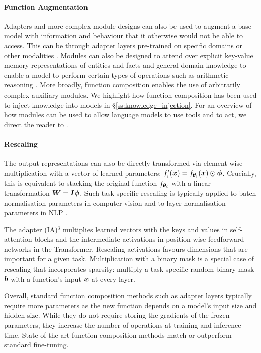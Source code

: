 \documentclass[10pt]{article} %
\begin{document}
\paragraph*{Function Augmentation} Adapters and more complex module designs can also be used to augment a base model with information and behaviour that it otherwise would not be able to access. This can be through adapter layers pre-trained on specific domains \citep{wang-etal-2021-k} or other modalities \citep{alayrac2022flamingo}. Modules can also be designed to attend over explicit key-value memory representations of entities and facts \citep{verga-etal-2021-adaptable} and general domain knowledge \citep{cheng-etal-2023-decouple} to enable a model to perform certain types of operations such as arithmetic reasoning \citep{trask2018neural,andor-etal-2019-giving}. More broadly, function composition enables the use of arbitrarily complex auxiliary modules. We highlight how function composition has been used to inject knowledge into models in \S\ref{ss:knowledge_injection}. For an overview of how modules can be used to allow language models to use tools and to act, we direct the reader to \cite{auglms:2023}.

 
\paragraph*{Rescaling} The output representations can also be directly transformed via element-wise multiplication with a vector of learned parameters: $f_i^\prime({\bm{x}}) = f_{{\bm{\theta}}_i }({\bm{x}}) \odot {\bm{\phi}}$. Crucially, this is equivalent to stacking the original function $f_{{\bm{\theta}}_i }$ with a linear transformation ${\bm{W}} = {\bm{I}}{\bm{\phi}}$.
Such task-specific rescaling is typically applied to batch normalisation parameters in computer vision \citep{Bilen2017Universal} and to layer normalisation parameters in NLP \citep{houlsby2019parameter}. 

The adapter (IA)${}^3$ \citep[Figure~\ref{fig:nature_modularity:ia3}; ][]{Liu2022IA3} multiplies learned vectors with the keys and values in self-attention blocks and the intermediate activations in position-wise feedforward networks in the Transformer. Rescaling activations favours dimensions that are important for a given task. Multiplication with a binary mask is a special case of rescaling that incorporates sparsity: \citet{strezoski2019many} multiply a task-specific random binary mask ${\bm{b}}$ with a function's input ${\bm{x}}$ at every layer.

Overall, standard function composition methods such as adapter layers typically require more parameters as the new function depends on a model's input size and hidden size. While they do not require storing the gradients of the frozen parameters, they increase the number of operations at training and inference time. State-of-the-art function composition methods match or outperform standard fine-tuning.
\end{document}
